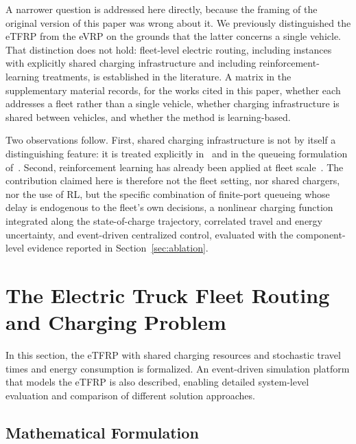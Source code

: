 \documentclass[journal]{IEEEtran}
\begin{document}
A narrower question is addressed here directly, because the framing of the original version of this paper was wrong about it. We previously distinguished the eTFRP from the eVRP on the grounds that the latter concerns a single vehicle. That distinction does not hold: fleet-level electric routing, including instances with explicitly shared charging infrastructure and including reinforcement-learning treatments, is established in the literature. A matrix in the supplementary material records, for the works cited in this paper, whether each addresses a fleet rather than a single vehicle, whether charging infrastructure is shared between vehicles, and whether the method is learning-based.



Two observations follow. First, shared charging infrastructure is not by itself a distinguishing feature: it is treated explicitly in~\cite{https://doi.org/10.1111/itor.12620} and in the queueing formulation of~\cite{ziyan2025}. Second, reinforcement learning has already been applied at fleet scale~\citep{ALQAHTANI2022122626,10310266}. The contribution claimed here is therefore not the fleet setting, nor shared chargers, nor the use of RL, but the specific combination of finite-port queueing whose delay is endogenous to the fleet's own decisions, a nonlinear charging function integrated along the state-of-charge trajectory, correlated travel and energy uncertainty, and event-driven centralized control, evaluated with the component-level evidence reported in Section~\ref{sec:ablation}.



\section{The Electric Truck Fleet Routing and Charging Problem}\label{sec:problem}

In this section, the eTFRP with shared charging resources and stochastic travel times and energy consumption is formalized. An event-driven simulation platform that models the eTFRP is also described, enabling detailed system-level evaluation and comparison of different solution approaches.

\subsection{Mathematical Formulation}\label{sec:problem_definition}
\end{document}
